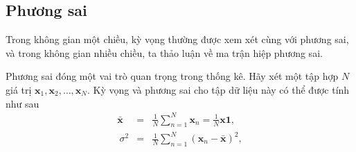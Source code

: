 \documentclass[12pt,a4paper,oneside]{report}
\numberwithin{equation}{section}
\begin{document}

%
%
%
\subsection{Phương sai} 
Trong không gian một chiều, kỳ vọng thường được xem xét cùng với phương sai, và trong không gian nhiều chiều, ta thảo luận về ma trận hiệp phương sai.

Phương sai đóng một vai trò quan trọng trong thống kê. Hãy xét một tập hợp $N$ giá trị $\mathbf{x}_1, \mathbf{x}_2, \dots, \mathbf{x}_N$. Kỳ vọng và phương sai cho tập dữ liệu này có thể được tính như sau
\begin{eqnarray} 
	\bar{\mathbf{x}} &=& \frac{1}{N}\sum_{n=1}^N \mathbf{x}_n = \frac{1}{N}\mathbf{x1},\\\ 
	\sigma^2 &=& \frac{1}{N} \sum_{n=1}^N (\mathbf{x}_n - \bar{\mathbf{x}})^2,
\end{eqnarray} 
\end{document}
